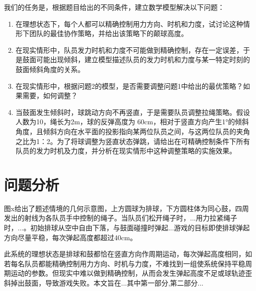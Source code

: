 \documentclass{cumcmthesis}
\begin{document}
我们的任务是，根据题目给出的不同条件，建立数学模型解决以下问题：
\begin{enumerate}
\item 在理想状态下，每个人都可以精确控制用力方向、时机和力度，试讨论这种情形下团队的最佳协作策略，并给出该策略下的颠球高度。
\item 在现实情形中，队员发力时机和力度不可能做到精确控制，存在一定误差，于是鼓面可能出现倾斜，建立模型描述队员的发力时机和力度与某一特定时刻的鼓面倾斜角度的关系。
\item 在现实情形中，根据问题2的模型，是否需要调整问题1中给出的最优策略？如果需要，如何调整？
\item 当鼓面发生倾斜时，球跳动方向不再竖直，于是需要队员调整拉绳策略。假设人数为10，绳长为2m，球的反弹高度为 60cm，相对于竖直方向产生1°的倾斜角度，且倾斜方向在水平面的投影指向某两位队员之间，与这两位队员的夹角之比为1：2。为了将球调整为竖直状态弹跳，请给出在可精确控制条件下所有队员的发力时机及力度，并分析在现实情形中这种调整策略的实施效果。
\end{enumerate}

\section{问题分析}
图x给出了题述情境的几何示意图，上方圆球为排球，下方圆柱体为同心鼓，四周发出的射线为各队员手中控制的绳子。当队员们松开绳子时，...用力拉紧绳子时，...。初始排球从空中自由下落，与鼓面碰撞时弹起...游戏的目标即使排球弹起方向尽量平稳，每次弹起高度都超过40cm。

此系统的理想状态是排球和鼓都恰在竖直方向作周期运动，每次弹起高度相同，如若每名队员都能精确控制用力方向、时机与力度，不难找到一组使系统保持平稳周期运动的参数。但现实中难以做到精确控制，从而会发生弹起高度不足或球轨迹歪斜掉出鼓面，导致游戏失败。本文旨在...其中第一部分,第二部分...
\end{document}
